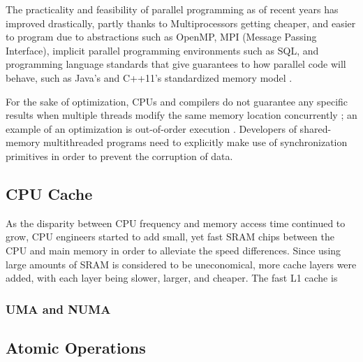 The practicality and feasibility of parallel programming as of recent years has improved drastically, partly thanks to Multiprocessors getting cheaper, and easier to program due to abstractions such as OpenMP, MPI (Message Passing Interface), implicit parallel programming environments such as SQL, and programming language standards that give guarantees to how parallel code will behave, such as Java's \cite{javamemorymodel2014} and C++11's \cite{cppmemorymodel} standardized memory model \cite[Chapter~2.2]{perfbook2021}.

For the sake of optimization, CPUs and compilers do not guarantee any specific results when multiple threads modify the same memory location concurrently \cite{drepper2007every}; an example of an optimization is out-of-order execution \cite[Appendix~B.7.1]{perfbook2021}. Developers of shared-memory multithreaded programs need to explicitly make use of synchronization primitives in order to prevent the corruption of data.

\subsection{CPU Cache}
As the disparity between CPU frequency and memory access time continued to grow, CPU engineers started to add small, yet fast SRAM chips between the CPU and main memory in order to alleviate the speed differences. Since using large amounts of SRAM is considered to be uneconomical, more cache layers were added, with each layer being slower, larger, and cheaper. The fast L1 cache is

\subsubsection{UMA and NUMA}
% 

\subsection{Atomic Operations}

